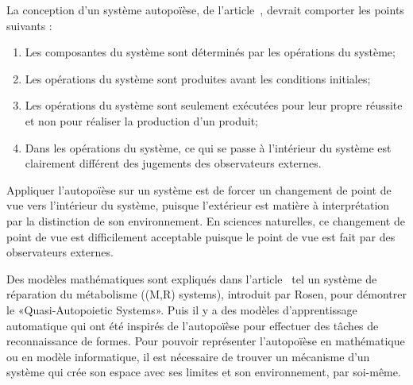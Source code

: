 
La conception d'un système autopoïèse, de l'article~\cite{tatsuya_computational_autopoiesis_2000}, devrait comporter les points suivants : 

\begin{enumerate}
    \item Les composantes du système sont déterminés par les opérations du système;
    \item Les opérations du système sont produites avant les conditions initiales;
    \item Les opérations du système sont seulement exécutées pour leur propre réussite et non pour réaliser la production d'un produit;
    \item Dans les opérations du système, ce qui se passe à l'intérieur du système est clairement différent des jugements des observateurs externes.
\end{enumerate}



Appliquer l'autopoïèse sur un système est de forcer un changement de point de vue vers l'intérieur du système, puisque l'extérieur est matière à interprétation par la distinction de son environnement. En sciences naturelles, ce changement de point de vue est difficilement acceptable puisque le point de vue est fait par des observateurs externes.

Des modèles mathématiques sont expliqués dans l'article~\cite{tatsuya_computational_autopoiesis_2000} tel un système de réparation du métabolisme ((M,R) systems), introduit par Rosen, pour démontrer le «Quasi-Autopoietic Systems».
Puis il y a des modèles d'apprentissage automatique qui ont été inspirés de l'autopoïèse pour effectuer des tâches de reconnaissance de formes. Pour pouvoir représenter l'autopoïèse en mathématique ou en modèle informatique, il est nécessaire de trouver un mécanisme d'un système qui crée son espace avec ses limites et son environnement, par soi-même.

